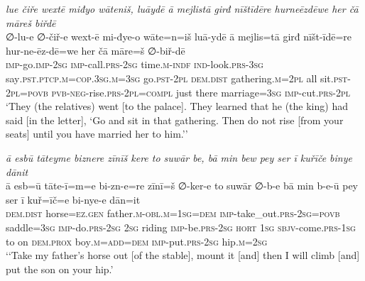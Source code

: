 \ea \label{KŠ.87}
\textit{lue čiře wextē miđyo wāteniš, luāydē ā mejlistā girđ nīštīdēre hurneēzdēwe her čā māreš biřdē} \\ 
\gll ∅-lu-e ∅-čiř-e wext-ē mi-đye-o wāte=n=iš luā-ydē ā mejlis=tā girđ nīšt-īdē=re hur-ne-ēz-dē=we her čā māre=š ∅-biř-dē \\ 
 \textsc{imp-}go.\textsc{imp-}\textsc{2sg} \textsc{imp-}call\textsc{.prs}-\textsc{2sg} time\textsc{.m}\textsc{-indf} \textsc{ind-}look\textsc{.prs}\textsc{-3sg} say\textsc{.pst}\textsc{.ptcp}\textsc{.m}\textsc{=cop}\textsc{.3sg}\textsc{.m}\textsc{=3sg} go\textsc{.pst}-\textsc{2pl} \textsc{dem.dist} gathering\textsc{.m}=\textsc{2pl} all sit\textsc{.pst}-\textsc{2pl}\textsc{=\textsc{povb}} \textsc{pvb-}\textsc{neg-}rise\textsc{.prs}-\textsc{2pl}\textsc{=compl} just there marriage\textsc{=3sg} \textsc{imp-}cut\textsc{.prs}-\textsc{2pl} \\ 
\glt `They (the relatives) went [to the palace]. They learned that he (the king) had said [in the letter], ‘Go and sit in that gathering. Then do not rise [from your seats] until you have married her to him.’'
\z 
 
\ea \label{KŠ.96}
\textit{ā esbū tāteyme biznere zīnīš kere to suwār be, bā min bew pey ser ī kuřīče binye dānit} \\ 
\gll ā esb=ū tāte-ī=m=e bi-zn-e=re zīnī=š ∅-ker-e to suwār ∅-b-e bā min b-e-ū pey ser ī kuř=īč=e bi-nye-e dān=it \\ 
 \textsc{dem.dist} horse\textsc{\textsc{=ez.gen}} father\textsc{.m}\textsc{-obl}\textsc{.m}\textsc{=\textsc{1sg}}\textsc{=dem} \textsc{imp-}take\_out\textsc{.prs}-\textsc{2sg}\textsc{=\textsc{povb}} saddle\textsc{=3sg} \textsc{imp-}do\textsc{.prs}-\textsc{2sg} \textsc{2sg} riding \textsc{imp-}be\textsc{.prs}-\textsc{2sg} \textsc{hort} \textsc{1sg} \textsc{sbjv-}come\textsc{.prs}\textsc{-\textsc{1sg}} to on \textsc{dem.prox} boy\textsc{.m}\textsc{=add}\textsc{=dem} \textsc{imp-}put\textsc{.prs}-\textsc{2sg} hip\textsc{.m}\textsc{=\textsc{2sg}} \\ 
\glt `‘Take my father’s horse out [of the stable], mount it [and] then I will climb [and] put the son on your hip.'
\z 
 
